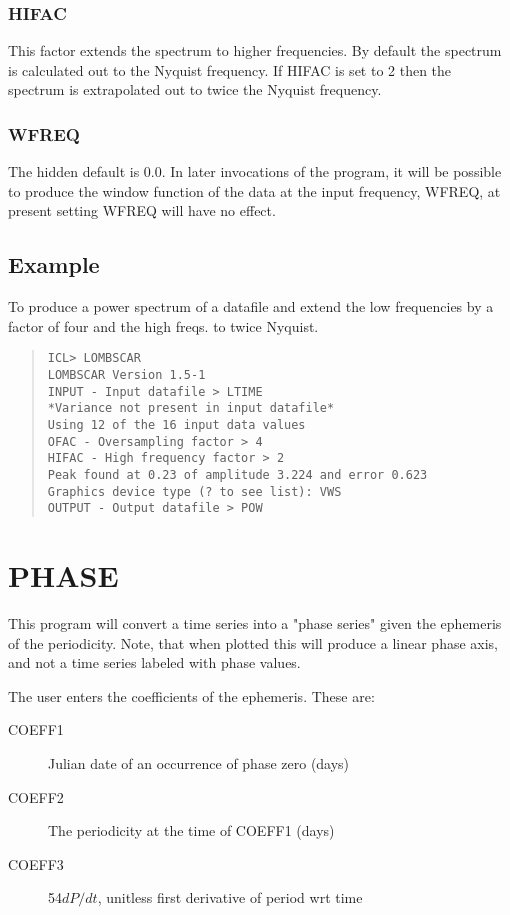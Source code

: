 \documentclass{book}
\renewcommand{\_}{{\tt\char'137}}     %
\begin{document}
\subsubsection{HIFAC}
This factor extends the spectrum to higher frequencies. By default
the spectrum is calculated out to the Nyquist frequency. If HIFAC
is set to 2 then the spectrum is extrapolated out to twice the
Nyquist frequency.
 
\subsubsection{WFREQ}
The hidden default is 0.0. In later invocations of the program,
it will be possible to produce the window function of the data at
the input frequency, WFREQ, at present setting WFREQ will have
no effect.
 
\subsection{Example}
To produce a power spectrum of a datafile and extend the low frequencies
by a factor of four and the high freqs. to twice Nyquist.
\begin{quote}\begin{verbatim}
ICL> LOMBSCAR
LOMBSCAR Version 1.5-1
INPUT - Input datafile > LTIME
*Variance not present in input datafile*
Using 12 of the 16 input data values
OFAC - Oversampling factor > 4
HIFAC - High frequency factor > 2
Peak found at 0.23 of amplitude 3.224 and error 0.623
Graphics device type (? to see list): VWS
OUTPUT - Output datafile > POW
\end{verbatim}\end{quote}
\section{PHASE}
This program will convert a time series into a "phase series"
given the ephemeris of the periodicity. Note, that when plotted
this will produce a linear phase axis, and not a time series
labeled with phase values.
 
The user enters the coefficients of the ephemeris. These are:
 
 
\begin{description}
\item[COEFF1]
Julian date of an occurrence of phase zero (days)
\item[COEFF2]
The periodicity at the time of COEFF1 (days)
\item[COEFF3]
54$dP/dt$, unitless first derivative of period wrt time
\end{description}
\end{document}
